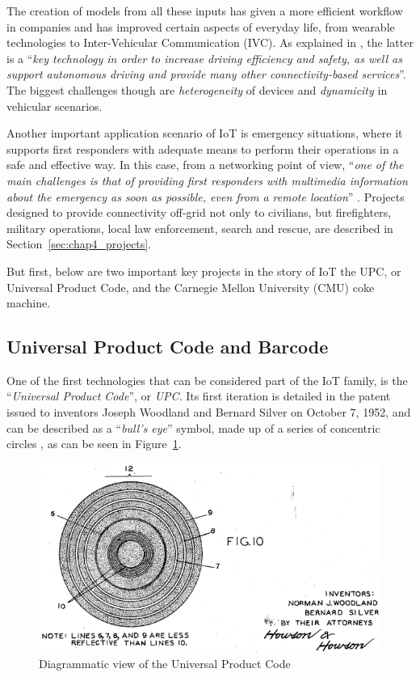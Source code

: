 		The creation of models from all these inputs has given a more efficient workflow in companies and has improved certain aspects of everyday life, from wearable technologies to Inter-Vehicular Communication (IVC).
		As explained in \cite{BUJARI2020101204}, the latter is a ``\textit{key technology in order to increase driving efficiency and safety, as well as	support autonomous driving and provide many other connectivity-based services}''.
		The biggest challenges though are \textit{heterogeneity} of devices and \textit{dynamicity} in vehicular scenarios.
		
		Another important application scenario of IoT is emergency situations, where it supports first responders with adequate means to perform their operations in a safe  and effective way.
		In this case, from a networking point of view, ``\textit{one of the main challenges is that of providing first responders with multimedia information about the emergency as soon as possible, even from a remote location}'' \cite{4197976}.
		Projects designed to provide connectivity off-grid not only to civilians, but firefighters, military operations, local law enforcement, search and rescue, are described in Section~\ref{sec:chap4_projects}.

		But first, below are two important key projects in the story of IoT the UPC, or Universal Product Code, and the Carnegie Mellon University (CMU) coke machine.
		
		\subsection{Universal Product Code and Barcode}
	
			One of the first technologies that can be considered part of the IoT family, is the ``\textit{Universal Product Code}'', or \textit{UPC}.
			Its first iteration is detailed in the patent issued to inventors Joseph Woodland and Bernard Silver on October 7, 1952, and can be described as a ``\textit{bull's eye}'' symbol, made up of a series of concentric circles \cite{upc_patent}, as can be seen in Figure~\ref{img:upc_patent}.
			
			\begin{figure}[h]
				\centering
				\includegraphics[width=\textwidth-4cm]{resources/img/chap2/upc_1}
				\caption[Diagrammatic view of the Universal Product Code]{Diagrammatic view of the Universal Product Code \cite{upc_patent}}
				\label{img:upc_patent}
			\end{figure}
			
